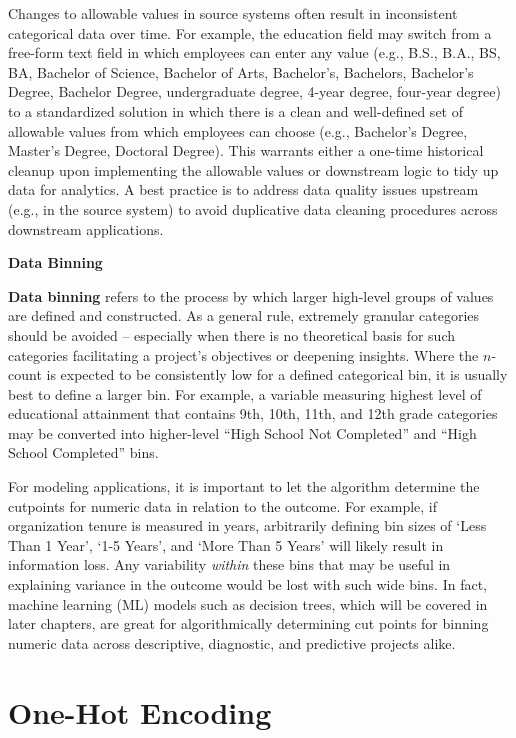 \documentclass[
]{book}
\begin{document}
Changes to allowable values in source systems often result in inconsistent categorical data over time. For example, the education field may switch from a free-form text field in which employees can enter any value (e.g., B.S., B.A., BS, BA, Bachelor of Science, Bachelor of Arts, Bachelor's, Bachelors, Bachelor's Degree, Bachelor Degree, undergraduate degree, 4-year degree, four-year degree) to a standardized solution in which there is a clean and well-defined set of allowable values from which employees can choose (e.g., Bachelor's Degree, Master's Degree, Doctoral Degree). This warrants either a one-time historical cleanup upon implementing the allowable values or downstream logic to tidy up data for analytics. A best practice is to address data quality issues upstream (e.g., in the source system) to avoid duplicative data cleaning procedures across downstream applications.

\textbf{Data Binning}

\textbf{Data binning} refers to the process by which larger high-level groups of values are defined and constructed. As a general rule, extremely granular categories should be avoided -- especially when there is no theoretical basis for such categories facilitating a project's objectives or deepening insights. Where the \(n\)-count is expected to be consistently low for a defined categorical bin, it is usually best to define a larger bin. For example, a variable measuring highest level of educational attainment that contains 9th, 10th, 11th, and 12th grade categories may be converted into higher-level ``High School Not Completed'' and ``High School Completed'' bins.

For modeling applications, it is important to let the algorithm determine the cutpoints for numeric data in relation to the outcome. For example, if organization tenure is measured in years, arbitrarily defining bin sizes of `Less Than 1 Year', `1-5 Years', and `More Than 5 Years' will likely result in information loss. Any variability \emph{within} these bins that may be useful in explaining variance in the outcome would be lost with such wide bins. In fact, machine learning (ML) models such as decision trees, which will be covered in later chapters, are great for algorithmically determining cut points for binning numeric data across descriptive, diagnostic, and predictive projects alike.

\hypertarget{one-hot-encoding}{%
\section{One-Hot Encoding}\label{one-hot-encoding}}
\end{document}
